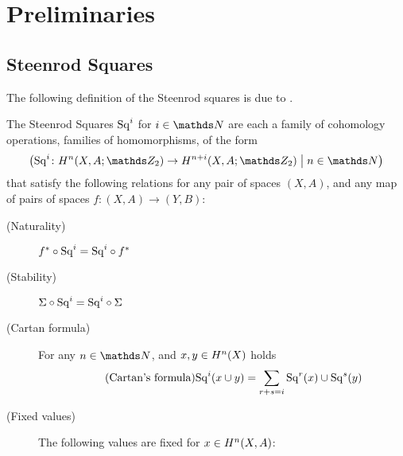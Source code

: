 % 

\chapter{Preliminaries}
\section{Steenrod Squares}

The following definition of the Steenrod squares is due to \cite[Chap.~I.1, p.~1]{steenrodepstein}.
\begin{Def}\label{def:sq}
  The Steenrod Squares $\mathrm{Sq}^{i}$ for $i\in\Nat$ are each a family of
  cohomology operations, \idest families of homomorphisms, of the form
  \begin{gather*}
    \left(
      \Sq i\colon \H^n(X, A;\Zmod2) \to \H^{n+i}(X, A;\Zmod2)
      \;\middle|\;
      n\in\Nat
    \right)
  \end{gather*}
  that satisfy the following relations for any pair of spaces $(X,A)$, and any map of
  pairs of spaces $f\colon (X,A)\to (Y,B)$:
  \begin{description}
  \item[(Naturality)]\label{item:sqnaturality} ${f}^*\circ\mathrm{Sq}^{i} = \mathrm{Sq}^{i}\circ{f}^*$
  \item[(Stability)]\label{item:sqstability} $\Sigma\circ\mathrm{Sq}^{i} = \mathrm{Sq}^{i}\circ\Sigma$ %
  \item[(Cartan formula)] For any $n\in\Nat$, and $x,y\in H^n(X)$ holds
    \begin{gather}\label{tag:cartan}\tag{Cartan's formula}
      \mathrm{Sq}^{i}(x\cup y) = \sum_{r+s=i}\mathrm{Sq}^{r}(x)\cup\mathrm{Sq}^{s}(y)
    \end{gather}
  \item[(Fixed values)] The following values are fixed for $x\in H^n(X,A)$:

\end{description}
\end{Def}
